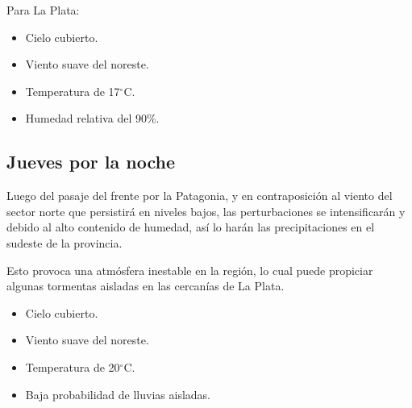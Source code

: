 \documentclass{article}
\begin{document}
Para La Plata:
\begin{itemize}
    \item Cielo cubierto.
    \item Viento suave del noreste.
    \item Temperatura de 17$^\circ$C.
    \item Humedad relativa del 90\%.
\end{itemize}

\subsection{Jueves por la noche}
Luego del pasaje del frente por la Patagonia, y en contraposición al viento del sector norte que persistirá en niveles bajos, las perturbaciones
se intensificarán y debido al alto contenido de humedad, así lo harán las precipitaciones en el sudeste de la provincia. 
\par Esto provoca una atmósfera inestable en la región, lo cual puede propiciar algunas tormentas aisladas en las cercanías de La Plata.

\begin{itemize}
    \item Cielo cubierto.
    \item Viento suave del noreste.
    \item Temperatura de 20$^\circ$C.
    \item Baja probabilidad de lluvias aisladas.
\end{itemize}
\end{document}
